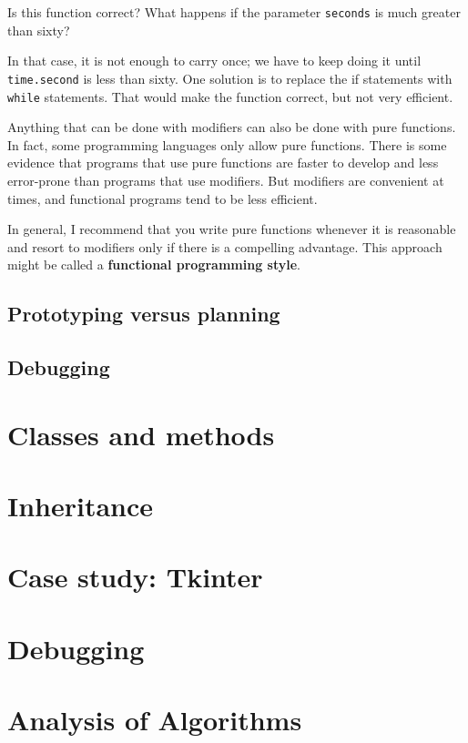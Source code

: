 \documentclass{article}
\begin{document}
\begin{multicols}{2}
Is this function correct? What happens if the parameter \verb|seconds| is
much greater than sixty?

In that case, it is not enough to carry once; we have to keep doing it
until \verb|time.second| is less than sixty. One solution is to replace the
if statements with \verb|while| statements. That would make the function
correct, but not very efficient.

Anything that can be done with modifiers can also be done with pure
functions. In fact, some programming languages only allow pure
functions. There is some evidence that programs that use pure
functions are faster to develop and less error-prone than programs
that use modifiers. But modifiers are convenient at times, and
functional programs tend to be less efficient.

In general, I recommend that you write pure functions whenever it is
reasonable and resort to modifiers only if there is a compelling
advantage. This approach might be called a \textbf{functional programming
style}.

\subsection{Prototyping versus planning}
\subsection{Debugging}


\end{multicols}

\newpage  %
\section{Classes and methods}
\newpage  %
\section{Inheritance}
\newpage  %
\section{Case study: Tkinter}
\newpage  %
\section{Debugging}
\newpage  %
\section{Analysis of Algorithms}
\newpage  %
\end{document}
